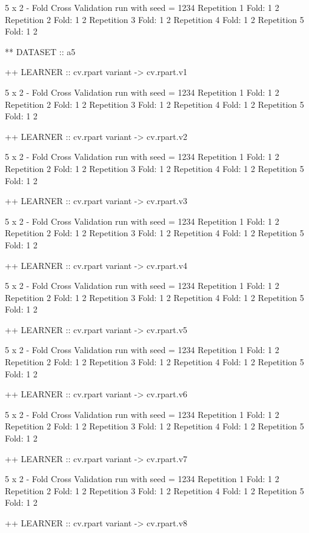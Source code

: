 \documentclass{article}
\begin{document}
\begin{Schunk}
\begin{Soutput}
 5 x 2 - Fold Cross Validation run with seed =  1234 
Repetition  1 
Fold:  1  2
Repetition  2 
Fold:  1  2
Repetition  3 
Fold:  1  2
Repetition  4 
Fold:  1  2
Repetition  5 
Fold:  1  2


** DATASET :: a5

++ LEARNER :: cv.rpart  variant ->  cv.rpart.v1 

 5 x 2 - Fold Cross Validation run with seed =  1234 
Repetition  1 
Fold:  1  2
Repetition  2 
Fold:  1  2
Repetition  3 
Fold:  1  2
Repetition  4 
Fold:  1  2
Repetition  5 
Fold:  1  2


++ LEARNER :: cv.rpart  variant ->  cv.rpart.v2 

 5 x 2 - Fold Cross Validation run with seed =  1234 
Repetition  1 
Fold:  1  2
Repetition  2 
Fold:  1  2
Repetition  3 
Fold:  1  2
Repetition  4 
Fold:  1  2
Repetition  5 
Fold:  1  2


++ LEARNER :: cv.rpart  variant ->  cv.rpart.v3 

 5 x 2 - Fold Cross Validation run with seed =  1234 
Repetition  1 
Fold:  1  2
Repetition  2 
Fold:  1  2
Repetition  3 
Fold:  1  2
Repetition  4 
Fold:  1  2
Repetition  5 
Fold:  1  2


++ LEARNER :: cv.rpart  variant ->  cv.rpart.v4 

 5 x 2 - Fold Cross Validation run with seed =  1234 
Repetition  1 
Fold:  1  2
Repetition  2 
Fold:  1  2
Repetition  3 
Fold:  1  2
Repetition  4 
Fold:  1  2
Repetition  5 
Fold:  1  2


++ LEARNER :: cv.rpart  variant ->  cv.rpart.v5 

 5 x 2 - Fold Cross Validation run with seed =  1234 
Repetition  1 
Fold:  1  2
Repetition  2 
Fold:  1  2
Repetition  3 
Fold:  1  2
Repetition  4 
Fold:  1  2
Repetition  5 
Fold:  1  2


++ LEARNER :: cv.rpart  variant ->  cv.rpart.v6 

 5 x 2 - Fold Cross Validation run with seed =  1234 
Repetition  1 
Fold:  1  2
Repetition  2 
Fold:  1  2
Repetition  3 
Fold:  1  2
Repetition  4 
Fold:  1  2
Repetition  5 
Fold:  1  2


++ LEARNER :: cv.rpart  variant ->  cv.rpart.v7 

 5 x 2 - Fold Cross Validation run with seed =  1234 
Repetition  1 
Fold:  1  2
Repetition  2 
Fold:  1  2
Repetition  3 
Fold:  1  2
Repetition  4 
Fold:  1  2
Repetition  5 
Fold:  1  2


++ LEARNER :: cv.rpart  variant ->  cv.rpart.v8 


\end{Soutput}
\end{Schunk}
\end{document}
